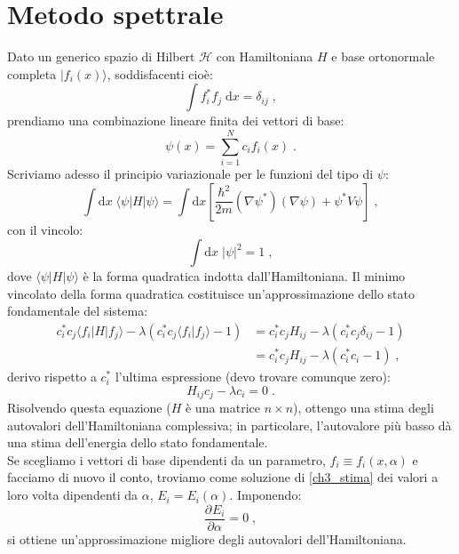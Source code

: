\documentclass[12pt,a4paper]{report}
\theoremstyle{definition}
\newcommand{\pdev}[3][]{\frac{\partial^{#1} #2}{\partial #3^{#1}}}
\newcommand{\ham}{\mathcal{H}}
\numberwithin{equation}{section}
\newcommand{\diff}[1][]{\mathrm{d}#1}
\newcommand{\bra}{\langle}
\newcommand{\ket}{\rangle}
\begin{document}
\section{Metodo spettrale}
Dato un generico spazio di Hilbert $\ham$ con Hamiltoniana $H$ e base ortonormale completa $|f_i(x)\ket$, soddisfacenti cioè:
$$
\int f_i^*f_j\;\diff{x}=\delta_{ij}\;,
$$
prendiamo una combinazione lineare finita dei vettori di base:
$$
\psi(x)=\sum_{i=1}^N c_if_i(x)\;.
$$
Scriviamo adesso il principio variazionale per le funzioni del tipo di $\psi$:
$$
\int\diff{x}\;\bra\psi|H|\psi\ket=\int\diff{x}\left[\frac{\hbar^2}{2m}(\nabla\psi^*)(\nabla\psi)+\psi^*V\psi\right]\;,
$$
con il vincolo:
$$
\int\diff{x}\;|\psi|^2=1\;,
$$
dove $\bra\psi|H|\psi\ket$ è la forma quadratica indotta dall'Hamiltoniana. Il minimo vincolato della forma quadratica costituisce un'approssimazione dello stato fondamentale del sistema:
\begin{align*}
c_i^*c_j\bra f_i|H|f_j\ket -\lambda\left(c_i^*c_j\bra f_i|f_j\ket-1\right) &=
c_i^*c_j H_{ij}-\lambda(c_i^*c_j\delta_{ij}-1) \\
&= c_i^*c_jH_{ij}-\lambda(c_i^*c_i-1)\;,
\end{align*}
derivo rispetto a $c_i^*$ l'ultima espressione (devo trovare comunque zero):
\begin{equation}
H_{ij}c_j-\lambda c_i=0\;. \label{ch3_stima}
\end{equation}
Risolvendo questa equazione ($H$ è una matrice $n\times n$), ottengo una stima degli autovalori dell'Hamiltoniana complessiva; in particolare, l'autovalore più basso dà una stima dell'energia dello stato fondamentale. \\
Se scegliamo i vettori di base dipendenti da un parametro, $f_i\equiv f_i(x,\alpha)$ e facciamo di nuovo il conto, troviamo come soluzione di \eqref{ch3_stima} dei valori a loro volta dipendenti da $\alpha$, $E_i=E_i(\alpha)$. Imponendo:
$$
\pdev{E_i}{\alpha}=0\;,
$$
si ottiene un'approssimazione migliore degli autovalori dell'Hamiltoniana.
\end{document}
